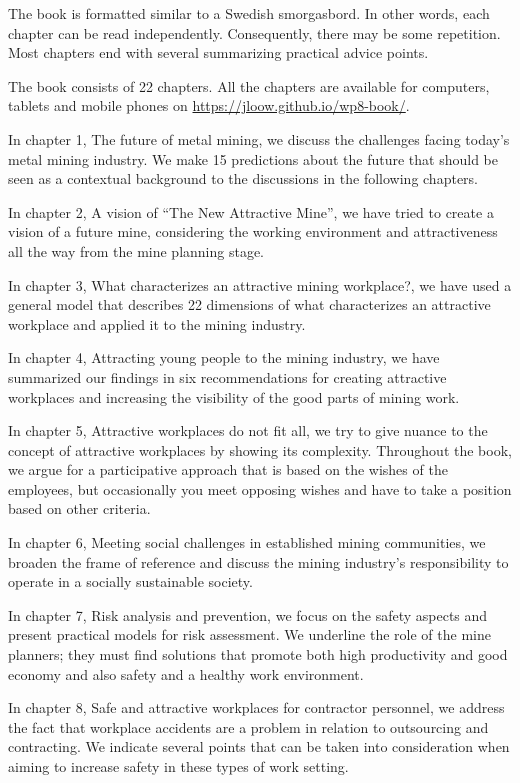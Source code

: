 \documentclass[
  12pt,
]{scrbook}
\begin{document}
The book is formatted similar to a Swedish smorgasbord. In other words, each chapter can be read independently. Consequently, there may be some repetition. Most chapters end with several summarizing practical advice points.

The book consists of 22 chapters. All the chapters are available for
computers, tablets and mobile phones on \url{https://jloow.github.io/wp8-book/}.

In chapter 1, The future of metal mining, we discuss the challenges facing today's metal mining industry. We make 15 predictions about the future that should be seen as a contextual background to the discussions in the following chapters.

In chapter 2, A vision of ``The New Attractive Mine'', we have tried to create a vision of a future mine, considering the working environment and attractiveness all the way from the mine planning stage.

In chapter 3, What characterizes an attractive mining workplace?, we have used a general model that describes 22 dimensions of what characterizes an attractive workplace and applied it to the mining industry.

In chapter 4, Attracting young people to the mining industry, we have summarized our findings in six recommendations for creating attractive workplaces and increasing the visibility of the good parts of mining work.

In chapter 5, Attractive workplaces do not fit all, we try to give nuance to the concept of attractive workplaces by showing its complexity. Throughout the book, we argue for a participative approach that is based on the wishes of the employees, but occasionally you meet opposing wishes and have to take a position based on other criteria.

In chapter 6, Meeting social challenges in established mining communities, we broaden the frame of reference and discuss the mining industry's responsibility to operate in a socially sustainable society.

In chapter 7, Risk analysis and prevention, we focus on the safety aspects and present practical models for risk assessment. We underline the role of the mine planners; they must find solutions that promote both high productivity and good economy and also safety and a healthy work environment.

In chapter 8, Safe and attractive workplaces for contractor personnel, we address the fact that workplace accidents are a problem in relation to outsourcing and contracting. We indicate several points that can be taken into consideration when aiming to increase safety in these types of work setting.
\end{document}
